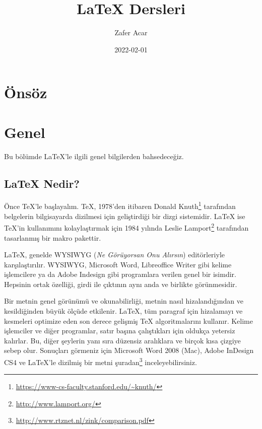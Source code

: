\documentclass[
  10pt,
]{scrbook}
\title{LaTeX Dersleri}
\author{Zafer Acar}
\date{2022-02-01}
\renewcommand{\href}[2]{#2\footnote{\url{#1}}}
\theoremstyle{definition}
\theoremstyle{definition}
\theoremstyle{definition}
\theoremstyle{definition}
\theoremstyle{remark}
\begin{document}
\maketitle

\newcommand{\insvg}{\begingroup%
\renewcommand{\includegraphics}{}%
\noindent\rule{\textwidth}{1pt}%
}%
\newcommand{\outsvg}{%
\\\noindent\rule{\textwidth}{1pt}%
\endgroup%
}%

{
\setcounter{tocdepth}{2}
\tableofcontents
}
\listoffigures
\listoftables
\hypertarget{uxf6nsuxf6z}{%
\chapter*{Önsöz}\label{uxf6nsuxf6z}}

\mainmatter

\hypertarget{genel}{%
\chapter{Genel}\label{genel}}

Bu bölümde LaTeX'le ilgili genel bilgilerden bahsedeceğiz.

\hypertarget{latex-nedir}{%
\section{LaTeX Nedir?}\label{latex-nedir}}

Önce TeX'le başlayalım. TeX, 1978'den itibaren \href{https://www-cs-faculty.stanford.edu/~knuth/}{Donald Knuth} tarafından belgelerin bilgisayarda dizilmesi için geliştirdiği bir dizgi sistemidir. LaTeX ise TeX'in kullanımını kolaylaştırmak için 1984 yılında \href{http://www.lamport.org/}{Leslie Lamport} tarafından tasarlanmış bir makro pakettir.

LaTeX, genelde WYSIWYG (\emph{Ne Görüyorsan Onu Alırsın}) editörleriyle karşılaştırılır. WYSIWYG, Microsoft Word, Libreoffice Writer gibi kelime işlemcilere ya da Adobe Indesign gibi programlara verilen genel bir isimdir. Hepsinin ortak özelliği, girdi ile çıktının aynı anda ve birlikte görünmesidir.

Bir metnin genel görünümü ve okunabilirliği, metnin nasıl hizalandığından ve kesildiğinden büyük ölçüde etkilenir. LaTeX, tüm paragraf için hizalamayı ve kesmeleri optimize eden son derece gelişmiş TeX algoritmalarını kullanır. Kelime işlemciler ve diğer programlar, satır başına çalıştıkları için oldukça yetersiz kalırlar. Bu, diğer şeylerin yanı sıra düzensiz aralıklara ve birçok kısa çizgiye sebep olur. Sonuçları görmeniz için Microsoft Word 2008 (Mac), Adobe InDesign CS4 ve LaTeX'le dizilmiş bir metni \href{http://www.rtznet.nl/zink/comparison.pdf}{şuradan} inceleyebilirsiniz.
\end{document}
